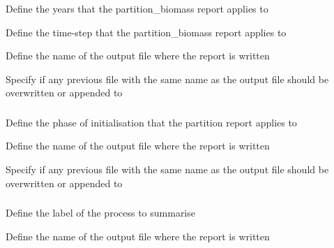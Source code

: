 {Define the years that the partition\_biomass report applies to}

 {Define the time-step that the partition\_biomass report applies to}

 {Define the name of the output file where the report is written}

 {Specify if any previous file with the same name as the output file should be overwritten or appended to}

\subsubsection[Print the partition at initialisation]{}

 {Define the phase of initialisation that the partition report applies to}

 {Define the name of the output file where the report is written}

 {Specify if any previous file with the same name as the output file should be overwritten or appended to}

\subsubsection[Print a summary of a process]{}

 {Define the label of the process to summarise}

 {Define the name of the output file where the report is written}


